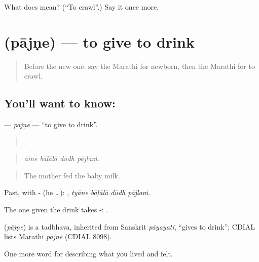 \begin{tcolorbox}[breakable,colback=teal!4,colframe=teal!35!black,title={Before you move on}]
What does  mean? (\textquotedblleft{}To crawl\textquotedblright{}.) Say it once more.
\end{tcolorbox}
\section[\texorpdfstring{\mr{पाजणे} (pājṇe)}{पाजणे (pājṇe)}]{ (pājṇe) — to give to drink}

\label{lesson:MR-C499-pajne}



\begin{quote}
Before the new one: say the Marathi for newborn, then the Marathi for to crawl.
\end{quote}

\subsection*{You'll want to know: }
\textbf{} — \emph{pājṇe} — \textquotedblleft{}to give to drink\textquotedblright{}.

\begin{quote}
   .
\end{quote}

\begin{quote}
\emph{āīne bāḷālā dūdh pājlaṁ.}
\end{quote}

\begin{quote}
The mother fed the baby milk.
\end{quote}

Past, with - (he …):    , \emph{tyāne bāḷālā dūdh pājlaṁ}.

The one given the drink takes -:  .

\begin{cousinweb}
\textbf{} (\emph{pājṇe}) is a tadbhava, inherited from Sanskrit \emph{pāyayati}, \textquotedblleft{}gives to drink\textquotedblright{}; CDIAL lists Marathi \emph{pājṇẽ} (CDIAL 8098).
\end{cousinweb}

\begin{grammarlens}[title={What you've built}]
One more word for describing what you lived and felt.
\end{grammarlens}

